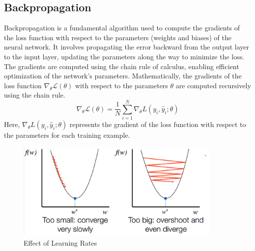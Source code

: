 \subsection{Backpropagation}
Backpropagation is a fundamental algorithm used to compute the gradients of the loss function with respect to the parameters (weights and biases) of the neural network. It involves propagating the error backward from the output layer to the input layer, updating the parameters along the way to minimize the loss. The gradients are computed using the chain rule of calculus, enabling efficient optimization of the network's parameters. Mathematically, the gradients of the loss function $\nabla_\theta \mathcal{L}(\theta)$ with respect to the parameters $\theta$ are computed recursively using the chain rule.
\begin{equation}
    \nabla_\theta \mathcal{L}(\theta)=\frac{1}{N} \sum_{i=1}^N \nabla_\theta L\left(y_i, \hat{y}_i ; \theta\right)
    \end{equation}
Here, $\nabla_\theta L\left(y_i, \hat{y}_i ; \theta\right)$ represents the gradient of the loss function with respect to the parameters for each training example.
\begin{figure}[ht]
    \centering
    \includegraphics[width=10cm]{images/Theory-DL/LR.png}
    \caption{Effect of Learning Rates}
    \label{fig:LR}
    \end{figure}
